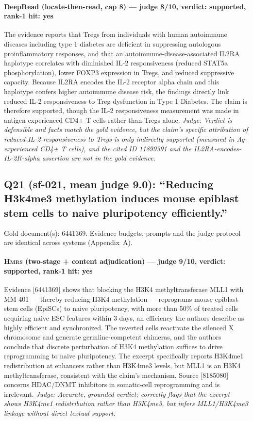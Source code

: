 \documentclass[sigconf, review, anonymous]{acmart}
\begin{document}
\paragraph{DeepRead (locate-then-read, cap 8) --- judge 8/10, verdict: supported, rank-1 hit: yes}
\noindent The evidence reports that Tregs from individuals with human autoimmune diseases including type 1 diabetes are deficient in suppressing autologous proinflammatory responses, and that an autoimmune-disease-associated IL2RA haplotype correlates with diminished IL-2 responsiveness (reduced STAT5a phosphorylation), lower FOXP3 expression in Tregs, and reduced suppressive capacity. Because IL2RA encodes the IL-2 receptor alpha chain and this haplotype confers higher autoimmune disease risk, the findings directly link reduced IL-2 responsiveness to Treg dysfunction in Type 1 Diabetes. The claim is therefore supported, though the IL-2 responsiveness measurement was made in antigen-experienced CD4+ T cells rather than Tregs alone.
\noindent\small\textit{Judge: Verdict is defensible and facts match the gold evidence, but the claim's specific attribution of reduced IL-2 responsiveness to Tregs is only indirectly supported (measured in Ag-experienced CD4+ T cells), and the cited ID 11899391 and the IL2RA-encodes-IL-2R-alpha assertion are not in the gold evidence.}

\subsection{Q21 (sf-021, mean judge 9.0): ``Reducing H3k4me3 methylation induces mouse epiblast stem cells to naive pluripotency efficiently.''}
\label{app:q21}
\noindent Gold document(s): 6441369. Evidence budgets, prompts and the judge protocol are identical across systems (Appendix~A).
\paragraph{\textbf{\textsc{Hmrs}} (two-stage + content adjudication) --- judge 9/10, verdict: supported, rank-1 hit: yes}
\noindent Evidence [6441369] shows that blocking the H3K4 methyltransferase MLL1 with MM-401 --- thereby reducing H3K4 methylation --- reprograms mouse epiblast stem cells (EpiSCs) to naive pluripotency, with more than 50\% of treated cells acquiring naive ESC features within 3 days, an efficiency the authors describe as highly efficient and synchronized. The reverted cells reactivate the silenced X chromosome and generate germline-competent chimeras, and the authors conclude that discrete perturbation of H3K4 methylation suffices to drive reprogramming to naive pluripotency. The excerpt specifically reports H3K4me1 redistribution at enhancers rather than H3K4me3 levels, but MLL1 is an H3K4 methyltransferase, consistent with the claim's mechanism. Source [8185080] concerns HDAC/DNMT inhibitors in somatic-cell reprogramming and is irrelevant.
\noindent\small\textit{Judge: Accurate, grounded verdict; correctly flags that the excerpt shows H3K4me1 redistribution rather than H3K4me3, but infers MLL1/H3K4me3 linkage without direct textual support.}
\end{document}
